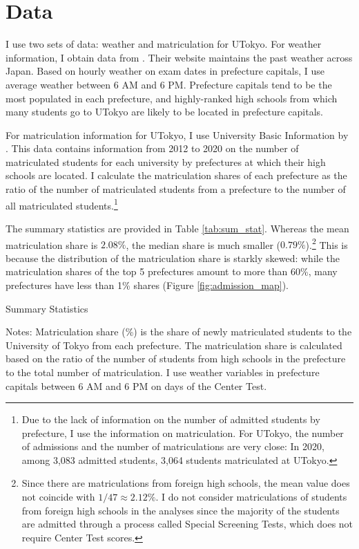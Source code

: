 \documentclass[12pt,letterpaper]{article}
\begin{document}
\section{Data}\label{sec:data}

I use two sets of data: weather and matriculation for UTokyo.
For weather information, I obtain data from .
Their website maintains the past weather across Japan.
Based on hourly weather on exam dates in prefecture capitals, I use average weather between 6 AM and 6 PM.
Prefecture capitals tend to be the most populated in each prefecture, and highly-ranked high schools from which many students go to UTokyo are likely to be located in prefecture capitals.

For matriculation information for UTokyo, I use University Basic Information by .
This data contains information from 2012 to 2020 on the number of matriculated students for each university by prefectures at which their high schools are located.
I calculate the matriculation shares of each prefecture as the ratio of the number of matriculated students from a prefecture to the number of all matriculated students.\footnote{
  Due to the lack of information on the number of admitted students by prefecture, I use the information on matriculation.
  For UTokyo, the number of admissions and the number of matriculations are very close:
  In 2020, among 3,083 admitted students, 3,064 students matriculated at UTokyo.
}

The summary statistics are provided in Table \ref{tab:sum_stat}.
Whereas the mean matriculation share is $2.08 \%$, the median share is much smaller ($0.79 \%$).\footnote{
  Since there are matriculations from foreign high schools, the mean value does not coincide with $1 / 47 \approx 2.12\%$.
  I do not consider matriculations of students from foreign high schools in the analyses since the majority of the students are admitted through a process called Special Screening Tests, which does not require Center Test scores.
}
This is because the distribution of the matriculation share is starkly skewed:
while the matriculation shares of the top 5 prefectures amount to more than 60\%, many prefectures have less than 1\% shares (Figure \ref{fig:admission_map}).


\begin{table}[!htbp]
  \centering
  \caption{Summary Statistics}
  \resizebox{0.8\linewidth}{!}{
  
  }
  \label{tab:sum_stat}
  \footnotesize
  \begin{tablenotes}
    \item 
      Notes:
      Matriculation share (\%) is the share of newly matriculated students to the University of Tokyo from each prefecture.
      The matriculation share is calculated based on the ratio of the number of students from high schools in the prefecture to the total number of matriculation.
      I use weather variables in prefecture capitals between 6 AM and 6 PM on days of the Center Test.
  \end{tablenotes}
\end{table}
\end{document}
